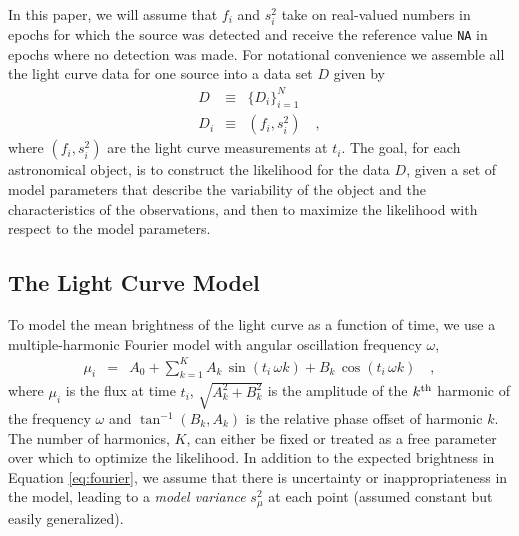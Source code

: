 \documentclass[12pt,preprint]{aastex}
\newcommand{\fobs}{f_i}
\newcommand{\sobs}{s^2_i}
\begin{document}
In this paper, we will assume that $\fobs$ and $\sobs$ take on real-valued numbers in epochs for which the source was detected and receive the reference value {\tt NA} in epochs where no detection was made. For notational convenience we assemble all the light curve data for one source into a data set $D$ given by
\begin{eqnarray}\displaystyle
D &\equiv& \{D_i\}_{i=1}^N
\\
D_i &\equiv& (\fobs, \sobs)
\quad ,
\end{eqnarray}
where $(\fobs, \sobs)$ are the light curve measurements  at $t_i$.  The goal, for each astronomical object, is to construct the likelihood for the data $D$, given a set of model parameters that describe the variability of the object and the characteristics of the observations, and then to maximize the likelihood with respect to the model parameters.%


\subsection{The Light Curve Model}

To model the mean brightness of the light curve as a function of time, we use a multiple-harmonic Fourier model with angular oscillation frequency $\omega$,
\begin{eqnarray}\displaystyle
\mu_i &=& A_0 + \sum_{k=1}^K A_k\, \sin (t_i \, \omega  k) + B_k\, \cos (t_i \, \omega  k)
\quad ,\label{eq:fourier}
\end{eqnarray}
where $\mu_i$ is the flux at time $t_i$, $\sqrt{A_k^2 + B_k^2}$ is the amplitude of the $k^{\rm th}$ harmonic of the frequency $\omega$ and $\tan^{-1}(B_k,A_k)$ is the relative phase offset of harmonic $k$.  The number of harmonics, $K$, can either be fixed or treated as a free parameter over which to optimize the likelihood.    In addition to the expected brightness in Equation \ref{eq:fourier}, we assume that there is uncertainty or inappropriateness in the model, leading to a \emph{model variance} $s_\mu^2$ at each point (assumed constant but easily generalized).
\end{document}
